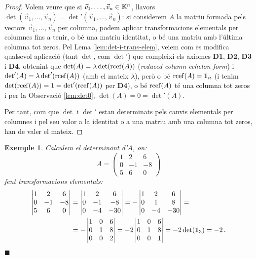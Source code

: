 \documentclass[
  11pt,
]{book}
\numberwithin{dummy}{section}
\theoremstyle{maincolornumbox}
\theoremstyle{blacknumex}
\newtheorem{exampleT}{Exemple}[chapter]
\theoremstyle{blacknumbox}
\theoremstyle{maincolornum}
\newenvironment{example}{\begin{exampleT}}{\hfill{\tiny\ensuremath{\blacksquare}}\end{exampleT}}
\begin{document}
\begin{proof}
Volem veure que si \(\vec v_1, \dots , \vec v_n \in \mathbb{K}^n\),
llavors
\(\det(\vec v_1, \dots , \vec v_n)=\det'(\vec v_1, \dots , \vec v_n)\): si
considerem \(A\) la matriu formada pels vectors
\(\vec v_1, \dots, \vec v_n\) per columna, podem aplicar transformacions
elementals per columnes fins a tenir, o bé una matriu identitat, o bé
una matriu amb l'última columna tot zeros. Pel Lema
\ref{lem:det-i-trans-elem}, veiem com es modifica qualsevol
aplicació (tant \(\det\), com \(\det'\)) que compleixi els axiomes \textbf{D1},
\textbf{D2}, \textbf{D3} i \textbf{D4}, obtenint que \(\det(A)=\lambda\det(\operatorname{rcef}(A))\)
(\emph{reduced column echelon form}) i \(\det'(A)=\lambda\det'(\operatorname{rcef}(A))\) (amb
el mateix \(\lambda\)), però o bé \(\operatorname{rcef}(A)=\mathbf{1}_n\) (i tenim
\(\det(\operatorname{rcef}(A))=1=\det'(\operatorname{rcef}(A))\) per \textbf{D4}), o bé \(\operatorname{rcef}(A)\) té una
columna tot zeros i per la Observació
\ref{lem:det0},
\(\det(A)=0=\det'(A)\).

Per tant, com que \(\det\) i \(\det'\) estan determinats pels canvis
elementals per columnes i pel seu valor a la identitat o a una matriu
amb una columna tot zeros, han de valer el mateix.
\end{proof}

\begin{example}
Calculem el determinant d'\(A\), on:\[A=\begin{pmatrix}
    1 & 2 & 6 \\ 0 & -1 & -8 \\ 5 & 6 & 0
    \end{pmatrix}\] fent transformacions elementals: \begin{align*}
    \begin{vmatrix}
    1 & 2 & 6 \\ 0 & -1 & -8 \\ 5 & 6 & 0
    \end{vmatrix} & =
    \begin{vmatrix}
    1 & 2 & 6 \\ 0 & -1 & -8 \\ 0 & -4 & -30
    \end{vmatrix}= 
    -\begin{vmatrix}
    1 & 2 & 6 \\ 0 & 1 & 8 \\ 0 & -4 & -30
    \end{vmatrix}= \\ &
    = -\begin{vmatrix}
    1 & 0 & 6 \\ 0 & 1 & 8 \\ 0 & 0 & 2
    \end{vmatrix}=
    -2\begin{vmatrix}
    1 & 0 & 6 \\ 0 & 1 & 8 \\ 0 & 0 & 1
    \end{vmatrix}= -2 \det(\mathbf{1}_3)=-2\,.
\end{align*}
\end{example}
\end{document}
